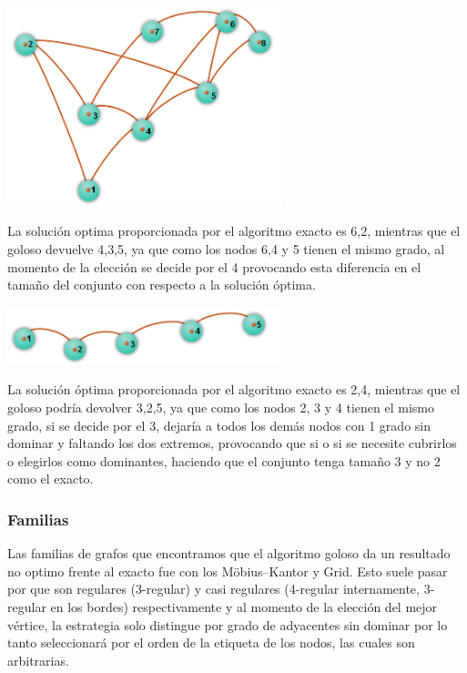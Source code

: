 \begin {center}
\includegraphics[width=8cm]{./graficos/grafo.png}
\end {center} 
La solución optima proporcionada por el algoritmo exacto es {6,2}, mientras que el goloso devuelve {4,3,5}, ya que como los nodos 6,4 y 5 tienen el mismo grado, al momento de la elección se decide por el 4 provocando esta diferencia en el tamaño del conjunto con respecto a la solución óptima.

\begin {center}
\includegraphics[width=8cm]{./graficos/grafo_camino.png}
\end {center} 
La solución óptima proporcionada por el algoritmo exacto es {2,4}, mientras que el goloso podría devolver {3,2,5}, ya que como los nodos 2, 3 y 4 tienen el mismo grado, si se decide por el 3, dejaría a todos los demás nodos con 1 grado sin dominar y faltando los dos extremos, provocando que si o si se necesite cubrirlos o elegirlos como dominantes, haciendo que el conjunto tenga tamaño 3 y no 2 como el exacto.

\subsubsection {Familias}
Las familias de grafos que encontramos que el algoritmo goloso da un resultado no optimo frente al exacto fue con los Möbius–Kantor y Grid. Esto suele pasar por que son regulares (3-regular) y casi regulares (4-regular internamente, 3-regular en los bordes) respectivamente y al momento de la elección del mejor vértice, la estrategia solo distingue por grado de adyacentes sin dominar por lo tanto seleccionará por el orden de la etiqueta de los nodos, las cuales son arbitrarias. 

